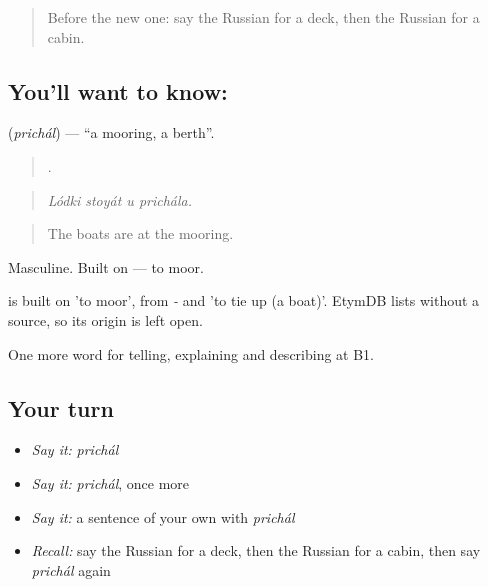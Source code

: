 \label{lesson:RU-C424-prichal}



\begin{quote}
Before the new one: say the Russian for a deck, then the Russian for a cabin.
\end{quote}

\subsection*{You'll want to know: }
\textbf{} (\emph{prichál}) — \textquotedblleft{}a mooring, a berth\textquotedblright{}.

\begin{quote}
   .
\end{quote}

\begin{quote}
\emph{Lódki stoyát u prichála.}
\end{quote}

\begin{quote}
The boats are at the mooring.
\end{quote}

Masculine. Built on \emph{} — to moor.

\begin{cousinweb}
\emph{} is built on \emph{} 'to moor', from \emph{-} and \emph{} 'to tie up (a boat)'. EtymDB lists \emph{} without a source, so its origin is left open.
\end{cousinweb}

\begin{grammarlens}[title={What you've built}]
One more word for telling, explaining and describing at B1.
\end{grammarlens}

\subsection*{Your turn}
\begin{itemize}
\raggedright
  \item \emph{Say it:} \emph{prichál}
  \item \emph{Say it:} \emph{prichál}, once more
  \item \emph{Say it:} a sentence of your own with \emph{prichál}
  \item \emph{Recall:} say the Russian for a deck, then the Russian for a cabin, then say \emph{prichál} again
\end{itemize}


